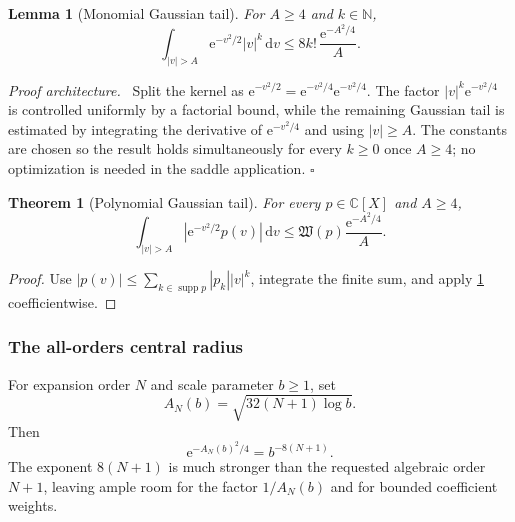 \documentclass[11pt,oneside]{article}
\newtheorem{theorem}{Theorem}[section]
\newtheorem{lemma}[lemma]{Lemma}
\theoremstyle{definition}
\theoremstyle{remark}
\newcommand{\C}{\mathbb C}
\newcommand{\N}{\mathbb N}
\newcommand{\e}{\mathrm e}
\newcommand{\dd}{\,\mathrm d}
\newcommand{\supp}{\operatorname{supp}}
\newenvironment{proofidea}{\par\smallskip\noindent\textit{Proof architecture.}\ }{\hfill$\square$\par\smallskip}
\begin{document}
\begin{lemma}[Monomial Gaussian tail]
\label{integration:lem:monomial-gaussian-tail}
For $A\ge4$ and $k\in\N$,
\begin{equation}
 \int_{|v|>A}\e^{-v^2/2}|v|^k\dd v
 \le 8k!\,\frac{\e^{-A^2/4}}{A}.
 \label{integration:eq:monomial-gaussian-tail}
\end{equation}
\end{lemma}

\begin{proofidea}
Split the kernel as
$\e^{-v^2/2}=\e^{-v^2/4}\e^{-v^2/4}$.  The factor
$|v|^k\e^{-v^2/4}$ is controlled uniformly by a factorial bound, while the remaining
Gaussian tail is estimated by integrating the derivative of $\e^{-v^2/4}$ and using
$|v|\ge A$.  The constants are chosen so the result holds simultaneously for every
$k\ge0$ once $A\ge4$; no optimization is needed in the saddle application.
\end{proofidea}

\begin{theorem}[Polynomial Gaussian tail]
\label{integration:thm:polynomial-gaussian-tail}
For every $p\in\C[X]$ and $A\ge4$,
\begin{equation}
 \int_{|v|>A}\left|\e^{-v^2/2}p(v)\right|\dd v
 \le \mathfrak W(p)\frac{\e^{-A^2/4}}{A}.
 \label{integration:eq:polynomial-gaussian-tail}
\end{equation}
\end{theorem}

\begin{proof}
Use
$|p(v)|\le\sum_{k\in\supp p}|p_k||v|^k$, integrate the finite sum, and apply
\cref{integration:lem:monomial-gaussian-tail} coefficientwise.
\end{proof}

\subsubsection{The all-orders central radius}

For expansion order $N$ and scale parameter $b\ge1$, set
\begin{equation}
 A_N(b)=\sqrt{32(N+1)\log b}.
 \label{integration:eq:order-central-radius}
\end{equation}
Then
\begin{equation}
 \e^{-A_N(b)^2/4}=b^{-8(N+1)}.
 \label{integration:eq:order-radius-exponential}
\end{equation}
The exponent $8(N+1)$ is much stronger than the requested algebraic order $N+1$, leaving
ample room for the factor $1/A_N(b)$ and for bounded coefficient weights.
\end{document}
